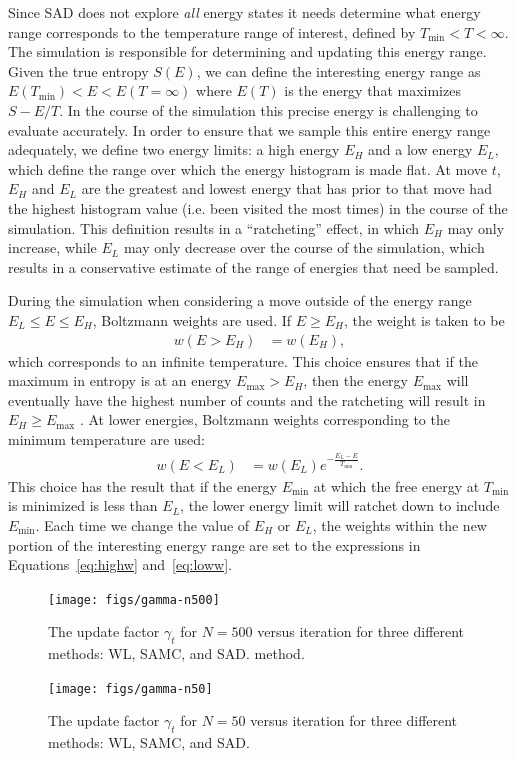 \documentclass[letterpaper,twocolumn,amsmath,amssymb,pre,aps,10pt]{revtex4-1}
\begin{document}
Since SAD does not explore \emph{all} energy states it needs determine
what energy range corresponds to the temperature range of interest,
defined by $T_{\min}<T<\infty$.
The
simulation is responsible for determining and updating this energy
range.
Given the true entropy $S(E)$, we can define the interesting energy
range as
  $E(T_{\min}) <E< E(T=\infty)$
where $E(T)$ is the energy that maximizes $S-E/T$.  In the course of the
simulation this precise energy is challenging to evaluate accurately.
In order to ensure that we sample this entire energy range adequately,
we define two energy limits:  a high energy $E_H$ and a low
energy $E_L$, which define the range over which the energy histogram
is made flat. At move $t$, $E_H$ and $E_L$ are the greatest and lowest
energy that has prior to that move
had the highest histogram value (i.e. been visited the most times) in
the course of the simulation.
This definition results in a ``ratcheting'' effect, in which $E_H$
may only increase, while $E_L$ may only decrease over the course of the
simulation, which results in a conservative estimate of the range of
energies that need be sampled.

During the simulation when considering a move outside of the energy
range $E_L \le E \le E_H$, Boltzmann weights are used.  If $E\ge E_H$,
the weight is taken to be
\begin{align}\label{eq:highw}
  w(E>E_H) &= w(E_H),
\end{align}
which corresponds to an infinite temperature.
This choice ensures that
if the maximum in entropy is at an energy $E_{\max}>E_H$, then the energy
$E_{\max}$
will eventually have the highest number of counts and the ratcheting will
result in $E_H\ge E_{\max}$ .
At lower energies, Boltzmann weights corresponding to the minimum temperature
are used:
\begin{align}\label{eq:loww}
  w(E<E_L) &= w(E_L)e^{-\frac{E_L-E}{T_{\min}}}.
\end{align}
This choice has the result that if the energy $E_{\min}$ at which the free
energy at $T_{\min}$ is minimized is less than $E_L$, the lower energy
limit will ratchet down to include $E_{\min}$.
Each time we change the value of $E_H$ or $E_L$, the weights within the
new portion of the interesting energy range are set to the expressions
in Equations~\ref{eq:highw} and~\ref{eq:loww}.

\begin{figure}
  \texttt{[image: figs/gamma-n500]}
  \caption{The update factor $\gamma_t$ for $N=500$ versus iteration for three
    different methods: WL, SAMC, and SAD.
    method.}\label{fig:gamma-vs-t}
\end{figure}
\begin{figure}
  \texttt{[image: figs/gamma-n50]}
  \caption{The update factor $\gamma_t$ for $N=50$ versus iteration for three
    different methods: WL, SAMC, and SAD.}
\end{figure}
\end{document}
